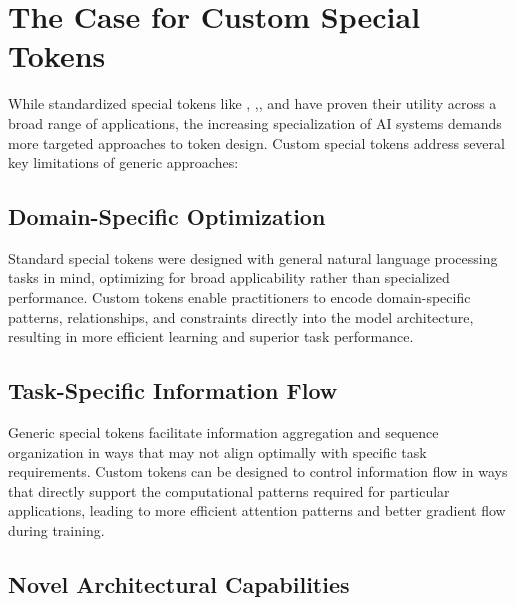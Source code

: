 \section{The Case for Custom Special Tokens}

While standardized special tokens like \cls{}, \sep{}, and \mask{} have proven their utility across a broad range of applications, the increasing specialization of AI systems demands more targeted approaches to token design. Custom special tokens address several key limitations of generic approaches:

\subsection{Domain-Specific Optimization}

Standard special tokens were designed with general natural language processing tasks in mind, optimizing for broad applicability rather than specialized performance. Custom tokens enable practitioners to encode domain-specific patterns, relationships, and constraints directly into the model architecture, resulting in more efficient learning and superior task performance.
\begin{comment}
Feedback: A concrete example would make this much stronger. For instance: "For example, a standard [SEP] token treats all boundaries equally, but in a legal document, the boundary between a 'clause' and a 'sub-clause' has a specific hierarchical meaning. A custom `<CLAUSE_END>` token can be trained to specifically capture this legal structure, leading to better document understanding."
\end{comment}

\subsection{Task-Specific Information Flow}

Generic special tokens facilitate information aggregation and sequence organization in ways that may not align optimally with specific task requirements. Custom tokens can be designed to control information flow in ways that directly support the computational patterns required for particular applications, leading to more efficient attention patterns and better gradient flow during training.

\subsection{Novel Architectural Capabilities}

